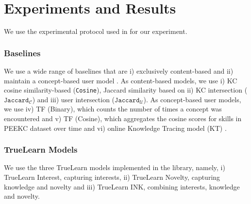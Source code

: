 \documentclass[letterpaper]{article} %
\begin{document}
\section{Experiments and Results}

We use the experimental protocol used in \cite{bulathwela2022sus} for our experiment. 

\subsubsection{Baselines} We use a wide range of baselines that are i) exclusively content-based and ii) maintain a concept-based user model \cite{zarrinkalam2020extracting}. As content-based models, we use i) KC cosine similarity-based (\texttt{Cosine}), Jaccard similarity based on ii) KC intersection ($\texttt{Jaccard}_{\mathcal{C}}$) and iii) user intersection ($\texttt{Jaccard}_{\mathcal{U}}$). As concept-based user models, we use iv) TF (Binary), which counts the number of times a concept was encountered and v) TF (Cosine), which aggregates the cosine scores for skills in PEEKC dataset over time and vi) online Knowledge Tracing model (KT) \cite{bishopsnewbook}. 

\subsubsection{TrueLearn Models} We use the three TrueLearn models implemented in the library, namely, i) TrueLearn Interest, capturing interests, ii) TrueLearn Novelty, capturing knowledge and novelty and iii) TrueLearn INK, combining interests, knowledge and novelty.

\end{document}
